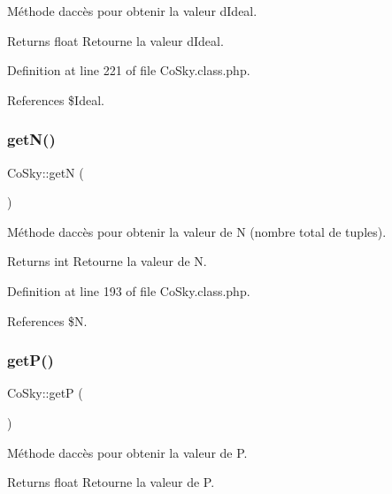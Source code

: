 Méthode d\textquotesingle{}accès pour obtenir la valeur d\textquotesingle{}Ideal.

\begin{DoxyReturn}{Returns}
float Retourne la valeur d\textquotesingle{}Ideal. 
\end{DoxyReturn}


Definition at line 221 of file Co\+Sky.\+class.\+php.



References \$\+Ideal.

\mbox{\label{class_co_sky_a81b9c7c69b7f974cbab31e8f24e290e5}} 
\subsubsection{\texorpdfstring{get\+N()}{getN()}}
{\footnotesize\ttfamily Co\+Sky\+::getN (\begin{DoxyParamCaption}{ }\end{DoxyParamCaption})}

Méthode d\textquotesingle{}accès pour obtenir la valeur de N (nombre total de tuples).

\begin{DoxyReturn}{Returns}
int Retourne la valeur de N. 
\end{DoxyReturn}


Definition at line 193 of file Co\+Sky.\+class.\+php.



References \$N.

\mbox{\label{class_co_sky_aa167cfe61e04f1961ea8450c79fad1ff}} 
\subsubsection{\texorpdfstring{get\+P()}{getP()}}
{\footnotesize\ttfamily Co\+Sky\+::getP (\begin{DoxyParamCaption}{ }\end{DoxyParamCaption})}

Méthode d\textquotesingle{}accès pour obtenir la valeur de P.

\begin{DoxyReturn}{Returns}
float Retourne la valeur de P. 
\end{DoxyReturn}


